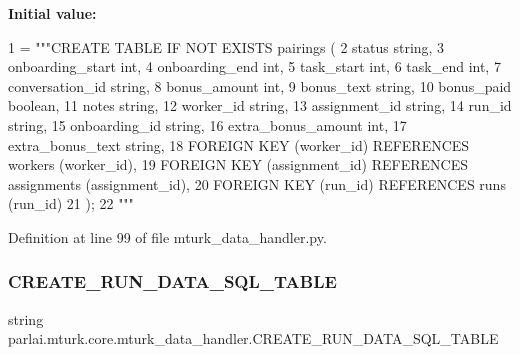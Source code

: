 {\bfseries Initial value\+:}
\begin{DoxyCode}
1 =  \textcolor{stringliteral}{"""CREATE TABLE IF NOT EXISTS pairings (}
2 \textcolor{stringliteral}{        status string,}
3 \textcolor{stringliteral}{        onboarding\_start int,}
4 \textcolor{stringliteral}{        onboarding\_end int,}
5 \textcolor{stringliteral}{        task\_start int,}
6 \textcolor{stringliteral}{        task\_end int,}
7 \textcolor{stringliteral}{        conversation\_id string,}
8 \textcolor{stringliteral}{        bonus\_amount int,}
9 \textcolor{stringliteral}{        bonus\_text string,}
10 \textcolor{stringliteral}{        bonus\_paid boolean,}
11 \textcolor{stringliteral}{        notes string,}
12 \textcolor{stringliteral}{        worker\_id string,}
13 \textcolor{stringliteral}{        assignment\_id string,}
14 \textcolor{stringliteral}{        run\_id string,}
15 \textcolor{stringliteral}{        onboarding\_id string,}
16 \textcolor{stringliteral}{        extra\_bonus\_amount int,}
17 \textcolor{stringliteral}{        extra\_bonus\_text string,}
18 \textcolor{stringliteral}{        FOREIGN KEY (worker\_id) REFERENCES workers (worker\_id),}
19 \textcolor{stringliteral}{        FOREIGN KEY (assignment\_id) REFERENCES assignments (assignment\_id),}
20 \textcolor{stringliteral}{        FOREIGN KEY (run\_id) REFERENCES runs (run\_id)}
21 \textcolor{stringliteral}{    );}
22 \textcolor{stringliteral}{    """}
\end{DoxyCode}


Definition at line 99 of file mturk\+\_\+data\+\_\+handler.\+py.

\mbox{\label{namespaceparlai_1_1mturk_1_1core_1_1mturk__data__handler_a7d90ca5a66368c8ee0303db002bf0df9}} 
\subsubsection{\texorpdfstring{C\+R\+E\+A\+T\+E\+\_\+\+R\+U\+N\+\_\+\+D\+A\+T\+A\+\_\+\+S\+Q\+L\+\_\+\+T\+A\+B\+LE}{CREATE\_RUN\_DATA\_SQL\_TABLE}}
{\footnotesize\ttfamily string parlai.\+mturk.\+core.\+mturk\+\_\+data\+\_\+handler.\+C\+R\+E\+A\+T\+E\+\_\+\+R\+U\+N\+\_\+\+D\+A\+T\+A\+\_\+\+S\+Q\+L\+\_\+\+T\+A\+B\+LE}

